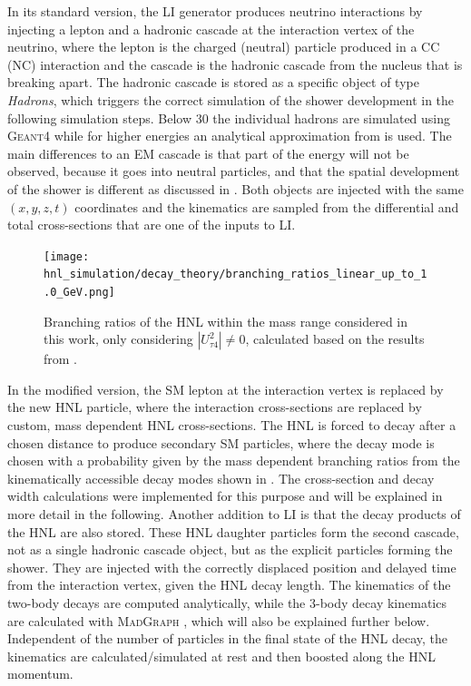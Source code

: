 In its standard version, the LI generator produces neutrino interactions by injecting a lepton and a hadronic cascade at the interaction vertex of the neutrino, where the lepton is the charged (neutral) particle produced in a CC (NC) interaction and the cascade is the hadronic cascade from the nucleus that is breaking apart. The hadronic cascade is stored as a specific object of type \textit{Hadrons}, which triggers the correct simulation of the shower development in the following simulation steps. Below \SI{30}{\gev} the individual hadrons are simulated using \textsc{Geant4}  while for higher energies an analytical approximation from  is used. The main differences to an EM cascade is that part of the energy will not be observed, because it goes into neutral particles, and that the spatial development of the shower is different as discussed in . Both objects are injected with the same $(x,y,z,t)$ coordinates and the kinematics are sampled from the differential and total cross-sections that are one of the inputs to LI.

\begin{figure}[h]
    \texttt{[image: hnl\_simulation/decay\_theory/branching\_ratios\_linear\_up\_to\_1.0\_GeV.png]}
    \caption[HNL branching ratios]{Branching ratios of the HNL within the mass range considered in this work, only considering $|U_{\tau4}^2| \neq 0$, calculated based on the results from \cite{Coloma:2020lgy}.}
\end{figure}

In the modified version, the SM lepton at the interaction vertex is replaced by the new HNL particle, where the interaction cross-sections are replaced by custom, mass dependent HNL cross-sections. The HNL is forced to decay after a chosen distance to produce secondary SM particles, where the decay mode is chosen with a probability given by the mass dependent branching ratios from the kinematically accessible decay modes shown in . The cross-section and decay width calculations were implemented for this purpose and will be explained in more detail in the following. Another addition to LI is that the decay products of the HNL are also stored. These HNL daughter particles form the second cascade, not as a single hadronic cascade object, but as the explicit particles forming the shower. They are injected with the correctly displaced position and delayed time from the interaction vertex, given the HNL decay length. The kinematics of the two-body decays are computed analytically, while the 3-body decay kinematics are calculated with \textsc{MadGraph} , which will also be explained further below. Independent of the number of particles in the final state of the HNL decay, the kinematics are calculated/simulated at rest and then boosted along the HNL momentum.

